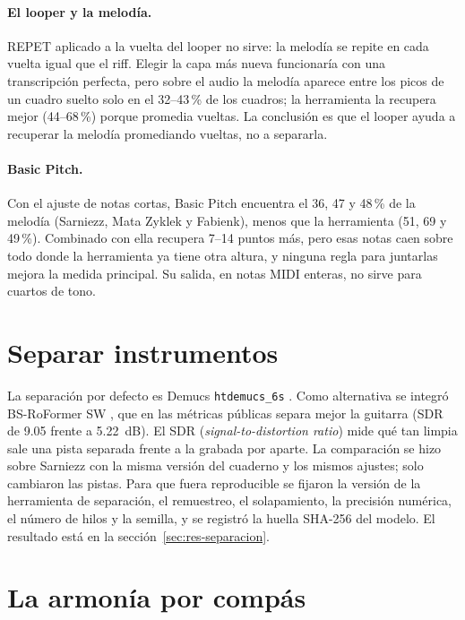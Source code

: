 \paragraph{El looper y la melodía.} REPET \citep{rafii2013} aplicado a la vuelta del looper no sirve: la melodía se
repite en cada vuelta igual que el riff. Elegir la capa más nueva funcionaría con una transcripción perfecta, pero sobre
el audio la melodía aparece entre los picos de un cuadro suelto solo en el 32--43\,\% de los cuadros; la herramienta la
recupera mejor (44--68\,\%) porque promedia vueltas. La conclusión es que el looper ayuda a recuperar la melodía
promediando vueltas, no a separarla.

\paragraph{Basic Pitch.} Con el ajuste de notas cortas, Basic Pitch \citep{bittner2022} encuentra el 36, 47 y 48\,\% de
la melodía (Sarniezz, Mata Zyklek y Fabienk), menos que la herramienta (51, 69 y 49\,\%). Combinado con ella recupera
7--14 puntos más, pero esas notas caen sobre todo donde la herramienta ya tiene otra altura, y ninguna regla para
juntarlas mejora la medida principal. Su salida, en notas MIDI enteras, no sirve para cuartos de tono.

\section{Separar instrumentos}\label{sec:separacion}

La separación por defecto es Demucs \texttt{htdemucs\_6s} \citep{rouard2023}. Como alternativa se integró BS-RoFormer SW
\citep{lu2024}, que en las métricas públicas separa mejor la guitarra (SDR de 9.05 frente a 5.22~dB). El SDR
(\emph{signal-to-distortion ratio}) mide qué tan limpia sale una pista separada frente a la grabada por aparte. La
comparación se hizo sobre Sarniezz con la misma versión del cuaderno y los mismos ajustes; solo cambiaron las pistas. Para
que fuera reproducible se fijaron la versión de la herramienta de separación, el remuestreo, el solapamiento, la
precisión numérica, el número de hilos y la semilla, y se registró la huella SHA-256 del modelo. El resultado está en la
sección~\ref{sec:res-separacion}.

\section{La armonía por compás}\label{sec:armonia-metodo}

